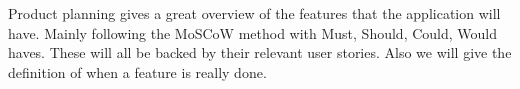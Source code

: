 Product planning gives a great overview of the features that the application will have. Mainly following the MoSCoW method with Must, Should, Could, Would haves. These will all be backed by their relevant user stories. Also we will give the definition of when a feature is really done.